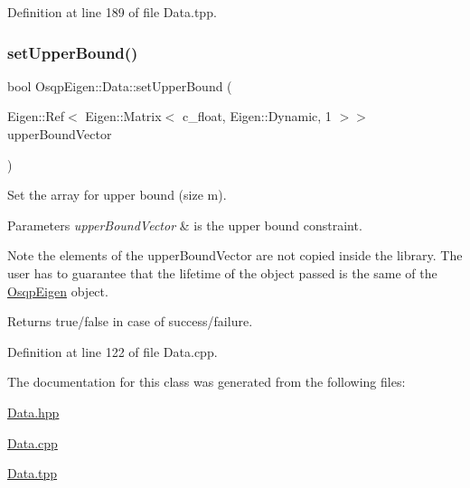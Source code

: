 Definition at line 189 of file Data.\+tpp.

\mbox{\label{classOsqpEigen_1_1Data_a192ea4157ba225bcf83dfce4231ca06f}} 
\subsubsection{\texorpdfstring{set\+Upper\+Bound()}{setUpperBound()}\hspace{0.1cm}{\footnotesize\ttfamily [2/2]}}
{\footnotesize\ttfamily bool Osqp\+Eigen\+::\+Data\+::set\+Upper\+Bound (\begin{DoxyParamCaption}\item[{Eigen\+::\+Ref$<$ Eigen\+::\+Matrix$<$ c\+\_\+float, Eigen\+::\+Dynamic, 1 $>$$>$}]{upper\+Bound\+Vector }\end{DoxyParamCaption})}



Set the array for upper bound (size m). 


\begin{DoxyParams}{Parameters}
{\em upper\+Bound\+Vector} & is the upper bound constraint. \\
\hline
\end{DoxyParams}
\begin{DoxyNote}{Note}
the elements of the upper\+Bound\+Vector are not copied inside the library. The user has to guarantee that the lifetime of the object passed is the same of the \mbox{\hyperlink{namespaceOsqpEigen}{Osqp\+Eigen}} object. 
\end{DoxyNote}
\begin{DoxyReturn}{Returns}
true/false in case of success/failure. 
\end{DoxyReturn}


Definition at line 122 of file Data.\+cpp.



The documentation for this class was generated from the following files\+:\begin{DoxyCompactItemize}
\item 
\mbox{\hyperlink{Data_8hpp}{Data.\+hpp}}\item 
\mbox{\hyperlink{Data_8cpp}{Data.\+cpp}}\item 
\mbox{\hyperlink{Data_8tpp}{Data.\+tpp}}\end{DoxyCompactItemize}
